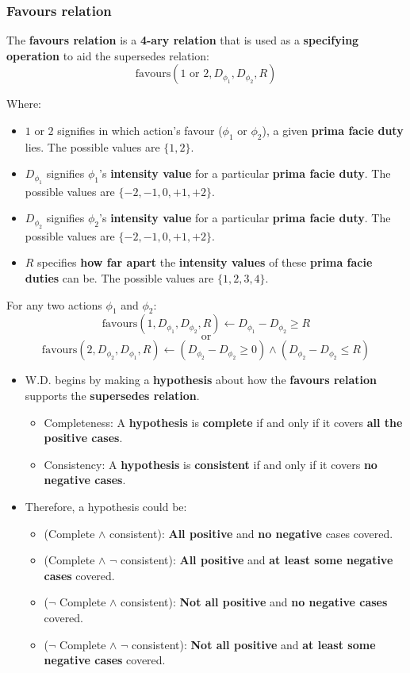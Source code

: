 \documentclass[11pt]{article}
\begin{document}
\subsubsection{Favours relation}
\label{sec:orgd795110}
The \textbf{favours relation} is a \textbf{4-ary relation} that is used as a \textbf{specifying operation} to aid the supersedes relation:
\[\text{favours}(1 \text{ or } 2, D_{\phi_1}, D_{\phi_2}, R)\]

Where:
\begin{itemize}
\item \(1\) or \(2\) signifies in which action's favour (\(\phi_1\) or \(\phi_2\)), a given \textbf{prima facie duty} lies. The possible values are \(\{1, 2\}\).
\item \(D_{\phi_1}\) signifies \(\phi_1\)'s \textbf{intensity value} for a particular \textbf{prima facie duty}. The possible values are \(\{-2, -1, 0, +1, +2\}\).
\item \(D_{\phi_2}\) signifies \(\phi_2\)'s \textbf{intensity value} for a particular \textbf{prima facie duty}. The possible values are \(\{-2, -1, 0, +1, +2\}\).
\item \(R\) specifies \textbf{how far apart} the \textbf{intensity values} of these \textbf{prima facie duties} can be. The possible values are \(\{1, 2, 3, 4\}\).
\end{itemize}

For any two actions \(\phi_1\) and \(\phi_2\):
\[\text{favours}(1, D_{\phi_1}, D_{\phi_2}, R) \leftarrow D_{\phi_1} - D_{\phi_2} \ge R\]
\[\text{or}\]
\[\text{favours}(2, D_{\phi_2}, D_{\phi_1}, R) \leftarrow (D_{\phi_2} - D_{\phi_2} \ge 0) \wedge (D_{\phi_2} - D_{\phi_2} \le R)\]

\begin{itemize}
\item W.D. begins by making a \textbf{hypothesis} about how the \textbf{favours relation} supports the \textbf{supersedes relation}.
\begin{itemize}
\item Completeness: A \textbf{hypothesis} is \textbf{complete} if and only if it covers \textbf{all the positive cases}.
\item Consistency: A \textbf{hypothesis} is \textbf{consistent} if and only if it covers \textbf{no negative cases}.
\end{itemize}
\item Therefore, a hypothesis could be:
\begin{itemize}
\item (Complete \(\wedge\) consistent): \textbf{All positive} and \textbf{no negative} cases covered.
\item (Complete \(\wedge\) \(\neg\) consistent): \textbf{All positive} and \textbf{at least some negative cases} covered.
\item (\(\neg\) Complete \(\wedge\) consistent): \textbf{Not all positive} and \textbf{no negative cases} covered.
\item (\(\neg\) Complete \(\wedge\) \(\neg\) consistent): \textbf{Not all positive} and \textbf{at least some negative cases} covered.
\end{itemize}
\end{itemize}
\end{document}
